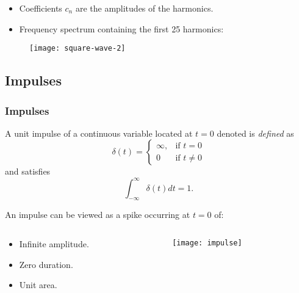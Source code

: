 
\begin{frame}
\begin{itemize}
\item Coefficients $c_{n}$ are the amplitudes of the harmonics.
\item Frequency spectrum containing the first 25 harmonics:
\end{itemize}
\begin{figure}
\centering
\texttt{[image: square-wave-2]}
\end{figure}
\end{frame}


\subsection{Impulses}


\begin{frame}
\frametitle{Impulses}
A unit impulse of a continuous variable located at $t=0$ denoted is \textit{defined} as
\begin{equation}
\delta(t) = \left \{
\begin{array}{ll}
\infty, & \text{if } t=0\\
0		& \text{if } t\neq 0
\end{array}
\right .
\end{equation}
and satisfies
\begin{equation}
\int_{-\infty}^{\infty} \delta(t) dt = 1.
\end{equation}
\end{frame}


\begin{frame}
An impulse can be viewed as a spike occurring at $t=0$ of:

\begin{columns}
\begin{column}{.3\textwidth}
\begin{itemize}
\item Infinite amplitude.
\item Zero duration.
\item Unit area.
\end{itemize}
\end{column}
\begin{column}{.7\textwidth}
\begin{figure}
\centering
\texttt{[image: impulse]}
\end{figure}
\end{column}
\end{columns}
\end{frame}

